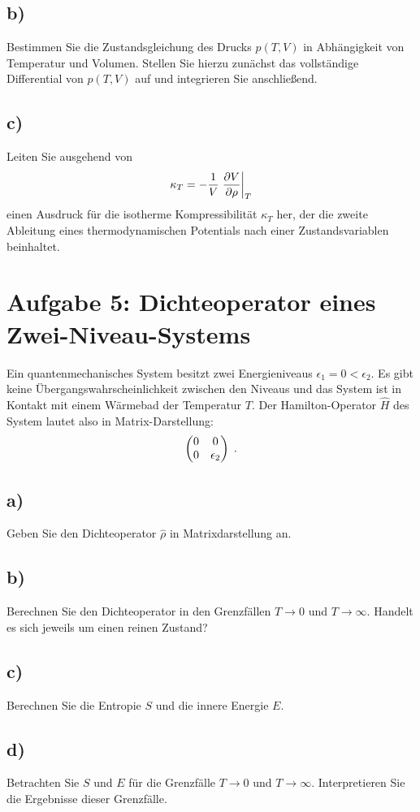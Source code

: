 \subsection{b)}
Bestimmen Sie die Zustandsgleichung des Drucks $p(T,V)$ in Abhängigkeit von Temperatur und Volumen.
Stellen Sie hierzu zunächst das vollständige Differential von $p(T,V)$ auf und integrieren Sie anschließend.

\subsection{c)}
Leiten Sie ausgehend von
\[
    \kappa_T = -\frac{1}{V}\left.\frac{\partial V}{\partial \rho}\right\rvert_{T}    
\]
einen Ausdruck für die isotherme Kompressibilität $\kappa_T$ her, der die zweite Ableitung eines thermodynamischen Potentials nach einer Zustandsvariablen beinhaltet.

\section{Aufgabe 5: Dichteoperator eines Zwei-Niveau-Systems}
Ein quantenmechanisches System besitzt zwei Energieniveaus $\epsilon_1 = 0 < \epsilon_2$.
Es gibt keine Übergangswahrscheinlichkeit zwischen den Niveaus und das System ist in Kontakt mit einem Wärmebad der Temperatur $T$.
Der Hamilton-Operator $\hat H$ des System lautet also in Matrix-Darstellung:
\[
    \begin{pmatrix}0 & 0 \\ 0 & \epsilon_2\end{pmatrix} \;.    
\]

\subsection{a)}
Geben Sie den Dichteoperator $\hat\rho$ in Matrixdarstellung an.

\subsection{b)}
Berechnen Sie den Dichteoperator in den Grenzfällen $T \to 0$ und $T \to \infty$.
Handelt es sich jeweils um einen reinen Zustand?

\subsection{c)}
Berechnen Sie die Entropie $S$ und die innere Energie $E$.

\subsection{d)}
Betrachten Sie $S$ und $E$ für die Grenzfälle $T \to 0$ und $T \to \infty$.
Interpretieren Sie die Ergebnisse dieser Grenzfälle.


